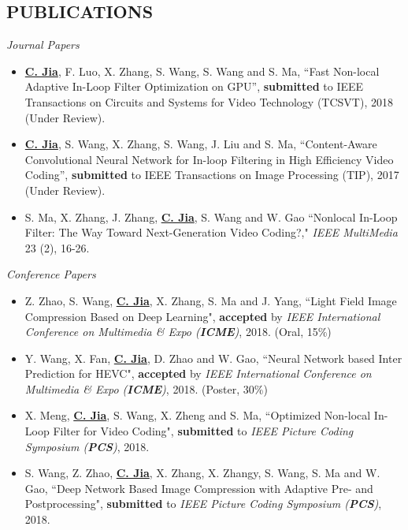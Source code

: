 \documentclass[margin, 10pt]{res} %
\begin{document}
\begin{resume}

\section{PUBLICATIONS}
{\sl Journal Papers}
\begin{itemize}
\item{\underline{\bf C. Jia}, F. Luo, X. Zhang, S. Wang, S. Wang and S. Ma, “Fast Non-local Adaptive In-Loop Filter Optimization on GPU”, {\bf submitted} to IEEE Transactions on Circuits and Systems for Video Technology (TCSVT), 2018 (Under Review).}
\item{\underline{\bf C. Jia}, S. Wang, X. Zhang, S. Wang, J. Liu and S. Ma, “Content-Aware Convolutional Neural Network for In-loop Filtering in High Efficiency Video Coding”, {\bf submitted} to IEEE Transactions on Image Processing (TIP), 2017 (Under Review).}
\item{S. Ma, X. Zhang, J. Zhang, \underline{\bf C. Jia}, S. Wang and W. Gao ``Nonlocal In-Loop Filter: The Way Toward Next-Generation Video Coding?," {\em {IEEE} MultiMedia} 23 (2), 16-26.}
\end{itemize}

{\sl Conference Papers}
\begin{itemize}
\item{Z. Zhao, S. Wang, \underline{\bf C. Jia}, X. Zhang, S. Ma and J. Yang, ``Light Field Image Compression Based on Deep Learning", {\bf accepted} by {\em IEEE International Conference on Multimedia \& Expo ({\bf ICME})}, 2018. (Oral, 15\%)}
    
\item{Y. Wang, X. Fan, \underline{\bf C. Jia}, D. Zhao and W. Gao, ``Neural Network based Inter Prediction for HEVC", {\bf accepted} by {\em IEEE International Conference on Multimedia \& Expo ({\bf ICME})}, 2018. (Poster, 30\%)}

\item{X. Meng, \underline{\bf C. Jia}, S. Wang, X. Zheng and S. Ma, ``Optimized Non-local In-Loop Filter for Video Coding", {\bf submitted} to {\em IEEE Picture Coding Symposium ({\bf PCS})}, 2018. }

\item{S. Wang, Z. Zhao, \underline{\bf C. Jia}, X. Zhang, X. Zhangy, S. Wang, S. Ma and W. Gao, ``Deep Network Based Image Compression with Adaptive Pre- and Postprocessing", {\bf submitted} to {\em IEEE Picture Coding Symposium ({\bf PCS})}, 2018. }


\end{itemize}
\end{resume}
\end{document}
